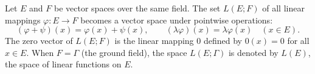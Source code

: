 Let $E$ and $F$ be vector spaces over the same field. The set $L(E; F)$ of all linear mappings $\varphi: E \to F$ becomes a vector space under pointwise operations:
$$
(\varphi + \psi)(x) = \varphi(x) + \psi(x), \qquad (\lambda \varphi)(x) = \lambda \varphi(x) \quad (x \in E).
$$
The zero vector of $L(E; F)$ is the linear mapping $0$ defined by $0(x) = 0$ for all $x \in E$. When $F = \Gamma$ (the ground field), the space $L(E; \Gamma)$ is denoted by $L(E)$, the space of linear functions on $E$.
